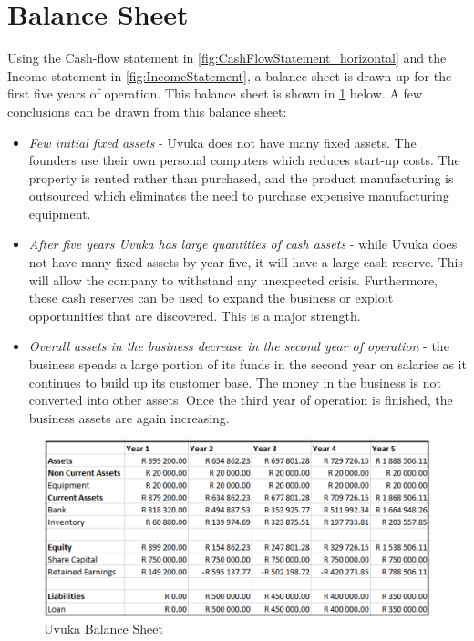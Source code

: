 \pagebreak
\section{Balance Sheet}

Using the Cash-flow statement in \cref{fig:CashFlowStatement_horizontal} and the Income statement in \cref{fig:IncomeStatement}, a balance sheet is drawn up for the first five years of operation. This balance sheet is shown in \cref{fig:BalanceSheet} below. A few conclusions can be drawn from this balance sheet:
\begin{itemize}
	\item \textit{Few initial fixed assets} - Uvuka does not have many fixed assets. The founders use their own personal computers which reduces start-up costs. The property is rented rather than purchased, and the product manufacturing is outsourced which eliminates the need to purchase expensive manufacturing equipment.  
    \item \textit{After five years Uvuka has large quantities of cash assets} - while Uvuka does not have many fixed assets by year five, it will have a large cash reserve. This will allow the company to withstand any unexpected crisis. Furthermore, these cash reserves can be used to expand the business or exploit opportunities that are discovered. This is a major strength.
    \item \textit{Overall assets in the business decrease in the second year of operation} - the business spends a large portion of its funds in the second year on salaries as it continues to build up its customer base. The money in the business is not converted into other assets. Once the third year of operation is finished, the business assets are again increasing.
    
\end{itemize}

\begin{figure}[H]
    \centering
    \includegraphics[width=1\textwidth]{images/BalanceSheet}
    \vskip10pt
    \caption[Uvuka Balance Sheet]{Uvuka Balance Sheet}
    \label{fig:BalanceSheet}
\end{figure}


